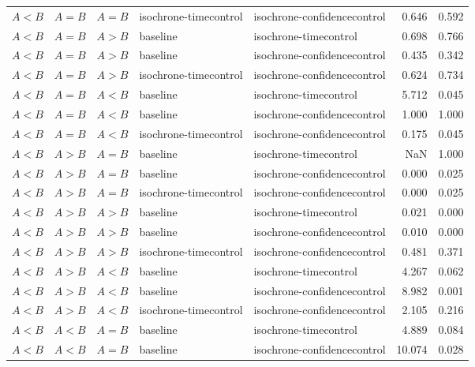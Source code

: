 \begin{tabular}{lllllrr}
   $A<B$ & $A=B$ &    $A=B$ & isochrone-timecontrol & isochrone-confidencecontrol &      0.646 &   0.592 \\
   $A<B$ & $A=B$ &    $A>B$ &              baseline &       isochrone-timecontrol &      0.698 &   0.766 \\
   $A<B$ & $A=B$ &    $A>B$ &              baseline & isochrone-confidencecontrol &      0.435 &   0.342 \\
   $A<B$ & $A=B$ &    $A>B$ & isochrone-timecontrol & isochrone-confidencecontrol &      0.624 &   0.734 \\
   $A<B$ & $A=B$ &    $A<B$ &              baseline &       isochrone-timecontrol &      5.712 &   0.045 \\
   $A<B$ & $A=B$ &    $A<B$ &              baseline & isochrone-confidencecontrol &      1.000 &   1.000 \\
   $A<B$ & $A=B$ &    $A<B$ & isochrone-timecontrol & isochrone-confidencecontrol &      0.175 &   0.045 \\
   $A<B$ & $A>B$ &    $A=B$ &              baseline &       isochrone-timecontrol &        NaN &   1.000 \\
   $A<B$ & $A>B$ &    $A=B$ &              baseline & isochrone-confidencecontrol &      0.000 &   0.025 \\
   $A<B$ & $A>B$ &    $A=B$ & isochrone-timecontrol & isochrone-confidencecontrol &      0.000 &   0.025 \\
   $A<B$ & $A>B$ &    $A>B$ &              baseline &       isochrone-timecontrol &      0.021 &   0.000 \\
   $A<B$ & $A>B$ &    $A>B$ &              baseline & isochrone-confidencecontrol &      0.010 &   0.000 \\
   $A<B$ & $A>B$ &    $A>B$ & isochrone-timecontrol & isochrone-confidencecontrol &      0.481 &   0.371 \\
   $A<B$ & $A>B$ &    $A<B$ &              baseline &       isochrone-timecontrol &      4.267 &   0.062 \\
   $A<B$ & $A>B$ &    $A<B$ &              baseline & isochrone-confidencecontrol &      8.982 &   0.001 \\
   $A<B$ & $A>B$ &    $A<B$ & isochrone-timecontrol & isochrone-confidencecontrol &      2.105 &   0.216 \\
   $A<B$ & $A<B$ &    $A=B$ &              baseline &       isochrone-timecontrol &      4.889 &   0.084 \\
   $A<B$ & $A<B$ &    $A=B$ &              baseline & isochrone-confidencecontrol &     10.074 &   0.028 \\

\end{tabular}
